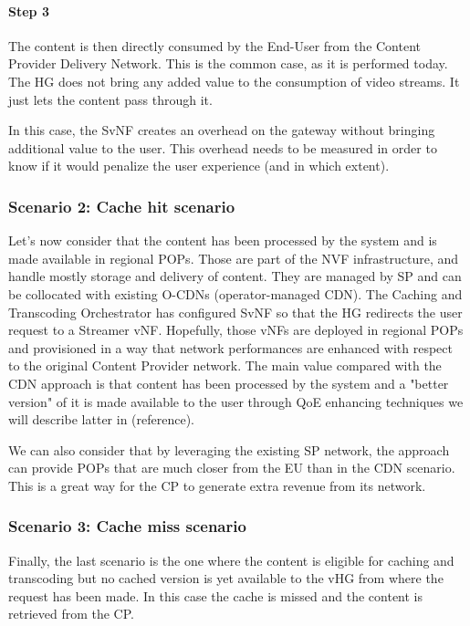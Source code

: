 \paragraph{Step 3}The content is then directly consumed by the End-User from the Content Provider Delivery Network.
This is the common case, as it is performed today.
The HG does not bring any added value to the consumption of video streams.
It just lets the content pass through it.

In this case, the SvNF creates an overhead on the gateway without bringing additional value to the user.
This overhead needs to be measured in order to know if it would penalize the user experience (and in which extent).

\subsubsection*{Scenario 2: Cache hit scenario}

Let's now consider that the content has been processed by the system and is made available in regional POPs.
Those are part of the NVF infrastructure, and handle mostly storage and delivery of content.
They are managed by SP and can be collocated with existing O-CDNs (operator-managed CDN).
The Caching and Transcoding Orchestrator has configured SvNF so that the HG redirects the user request to a Streamer vNF.
Hopefully, those vNFs are deployed in regional POPs and provisioned in a way that network performances are enhanced with respect to the original Content Provider network.
The main value compared with the CDN approach is that content has been processed by the system and a "better version" of it is made available to the user through QoE enhancing techniques we will describe latter in (reference).

We can also consider that by leveraging the existing SP network, the approach can provide POPs that are much closer from the EU than in the CDN scenario.
This is a great way for the CP to generate extra revenue from its network.	

\subsubsection*{Scenario 3: Cache miss scenario}

Finally, the last scenario is the one where the content is eligible for caching and transcoding but no cached version is yet available to the vHG from where the request has been made.
In this case the cache is missed and the content is retrieved from the CP.


